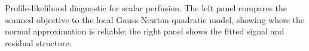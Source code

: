 \caption{Profile-likelihood diagnostic for scalar perfusion. The left panel compares the scanned objective to the local Gauss-Newton quadratic model, showing where the normal approximation is reliable; the right panel shows the fitted signal and residual structure.}\label{fig:profile-likelihood-diagnostic}
